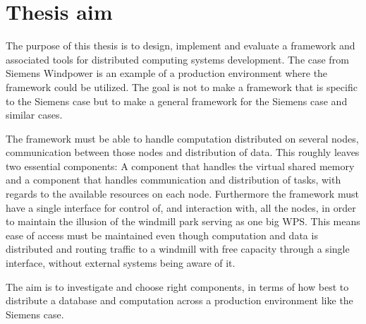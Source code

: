
\section{Thesis aim}

The purpose of this thesis is to design, implement and evaluate a framework and associated tools for distributed computing systems development. The case from Siemens Windpower is an example of a production environment where the framework could be utilized. The goal is not to make a framework that is specific to the Siemens case but to make a general framework for the Siemens case and similar cases. 

The framework must be able to handle computation distributed on several nodes, communication between those nodes and distribution of data. This roughly leaves two essential components: A component that handles the virtual shared memory and a component that handles communication and distribution of tasks, with regards to the available resources on each node. Furthermore the framework must have a single interface for control of, and interaction with, all the nodes, in order to maintain the illusion of the windmill park serving as one big WPS. This means ease of access must be maintained even though computation and data is distributed and routing traffic to a windmill with free capacity through a single interface, without external systems being aware of it.

The aim is to investigate and choose right components, in terms of how best to distribute a database and computation across a production environment like the Siemens case. 


